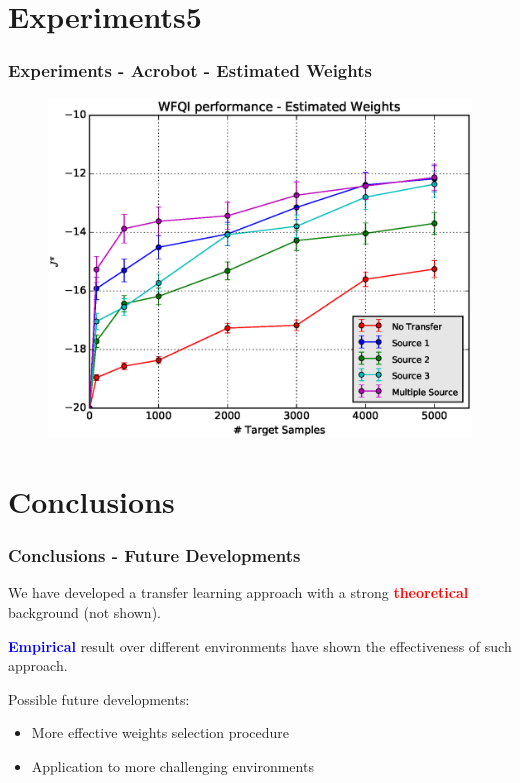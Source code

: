 \documentclass[professionalfont]{beamer}
\begin{document}
    \section{Experiments5}
      \begin{frame}
      \frametitle{Experiments - Acrobot - Estimated Weights}
        \begin{figure}
          \includegraphics[scale=0.5]{images/WFQIPerf_acro.eps}
          \label{}
        \end{figure}
      \end{frame}

    \section{Conclusions}
    \begin{frame}
      \frametitle{Conclusions - Future Developments}
      We have developed a transfer learning approach with a strong \textcolor{red}{\textbf{theoretical}}
      background (not shown).\newline

      \textcolor{blue}{\textbf{Empirical}} result over different environments have shown the effectiveness of such approach.\newline

      Possible future developments:
      \begin{itemize}
        \item More effective weights selection procedure
        \item Application to more challenging environments
      \end{itemize}
    \end{frame}
\end{document}
